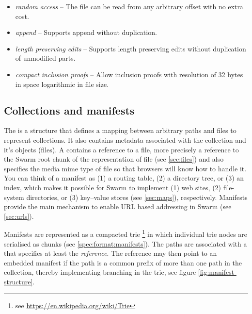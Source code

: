 \begin{itemize}
    \item \emph{random access} -- The file can be read from any arbitrary offset with no extra cost.
    \item \emph{append} -- Supports append without duplication. 
    \item \emph{length preserving edits} -- Supports length preserving edits without duplication of unmodified parts.
    \item \emph{compact inclusion proofs} -- Allow inclusion proofs with resolution of 32 bytes in space logarithmic in file size.
\end{itemize}



\subsection{Collections and manifests\statusgreen}\label{sec:collections}

The  is a structure that defines a mapping between arbitrary paths and files to represent collections. It also contains metadata associated with the collection and it's objects (files). A  contains a reference to a file, more precisely a reference to the Swarm root chunk of the representation of file (see \ref{sec:files}) and also specifies the media mime type of file so that browsers will know how to handle it. You can think of a manifest as (1) a routing table, (2) a directory tree, or  (3) an index, which makes it possible for Swarm to implement (1) web sites, (2) file-system directories, or (3) key--value stores (see \ref{sec:maps}), respectively. Manifests provide the main mechanism to enable URL based addressing in Swarm (see \ref{sec:urls}). 

Manifests are represented as a compacted trie%
%
\footnote{see \url{https://en.wikipedia.org/wiki/Trie}}
%
in which individual trie nodes are serialised as chunks (see \ref{spec:format:manifests}). The paths are associated with a  that specifies at least the \emph{reference}. The reference may then point to an embedded manifest if the path is a common prefix of more than one path in the collection, thereby implementing branching in the trie, see figure \ref{fig:manifest-structure}. 


